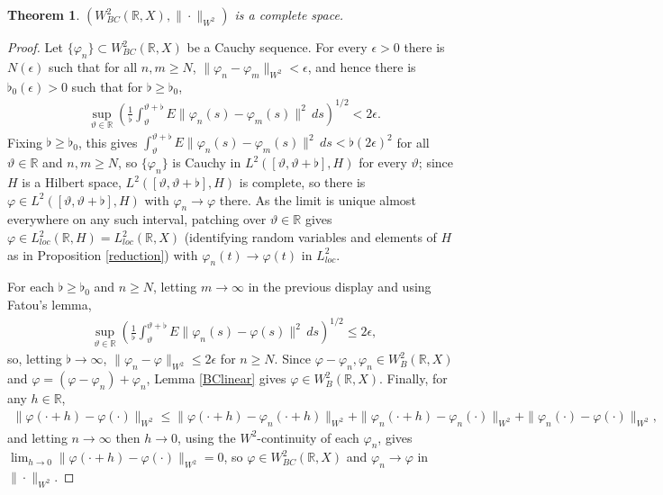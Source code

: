 \documentclass[11pt]{amsart}
\newtheorem{theorem}{Theorem}[section]
\begin{document}
\begin{theorem}\label{BCcomplete}
$(W^2_{BC}(\mathbb R,X),\|\cdot\|_{W^2})$ is a complete space.
\end{theorem}

\begin{proof}
Let $\{\varphi_n\}\subset W^2_{BC}(\mathbb R,X)$ be a Cauchy sequence. For every $\epsilon>0$ there is $N(\epsilon)$ such that for all $n,m\ge N$, $\|\varphi_n-\varphi_m\|_{W^2}<\epsilon$, and hence there is $\flat_0(\epsilon)>0$ such that for $\flat\ge\flat_0$,
\begin{align*}
\sup_{\vartheta\in\mathbb R}\left(\frac1\flat\int_\vartheta^{\vartheta+\flat}E\|\varphi_n(s)-\varphi_m(s)\|^2\,ds\right)^{1/2}<2\epsilon.
\end{align*}
Fixing $\flat\ge\flat_0$, this gives $\int_\vartheta^{\vartheta+\flat}E\|\varphi_n(s)-\varphi_m(s)\|^2\,ds<\flat(2\epsilon)^2$ for all $\vartheta\in\mathbb R$ and $n,m\ge N$, so $\{\varphi_n\}$ is Cauchy in $L^2([\vartheta,\vartheta+\flat],H)$ for every $\vartheta$; since $H$ is a Hilbert space, $L^2([\vartheta,\vartheta+\flat],H)$ is complete, so there is $\varphi\in L^2([\vartheta,\vartheta+\flat],H)$ with $\varphi_n\to\varphi$ there. As the limit is unique almost everywhere on any such interval, patching over $\vartheta\in\mathbb R$ gives $\varphi\in L^2_{loc}(\mathbb R,H)=L^2_{loc}(\mathbb R,X)$ (identifying random variables and elements of $H$ as in Proposition \ref{reduction}) with $\varphi_n(t)\to\varphi(t)$ in $L^2_{loc}$.

For each $\flat\ge\flat_0$ and $n\ge N$, letting $m\to\infty$ in the previous display and using Fatou's lemma,
\begin{align*}
\sup_{\vartheta\in\mathbb R}\left(\frac1\flat\int_\vartheta^{\vartheta+\flat}E\|\varphi_n(s)-\varphi(s)\|^2\,ds\right)^{1/2}\le2\epsilon,
\end{align*}
so, letting $\flat\to\infty$, $\|\varphi_n-\varphi\|_{W^2}\le2\epsilon$ for $n\ge N$. Since $\varphi-\varphi_n,\varphi_n\in W^2_B(\mathbb R,X)$ and $\varphi=(\varphi-\varphi_n)+\varphi_n$, Lemma \ref{BClinear} gives $\varphi\in W^2_B(\mathbb R,X)$. Finally, for any $h\in\mathbb R$,
\begin{align*}
\|\varphi(\cdot+h)-\varphi(\cdot)\|_{W^2}\le\|\varphi(\cdot+h)-\varphi_n(\cdot+h)\|_{W^2}+\|\varphi_n(\cdot+h)-\varphi_n(\cdot)\|_{W^2}+\|\varphi_n(\cdot)-\varphi(\cdot)\|_{W^2},
\end{align*}
and letting $n\to\infty$ then $h\to0$, using the $W^2$-continuity of each $\varphi_n$, gives $\lim_{h\to0}\|\varphi(\cdot+h)-\varphi(\cdot)\|_{W^2}=0$, so $\varphi\in W^2_{BC}(\mathbb R,X)$ and $\varphi_n\to\varphi$ in $\|\cdot\|_{W^2}$.
\end{proof}
\end{document}
